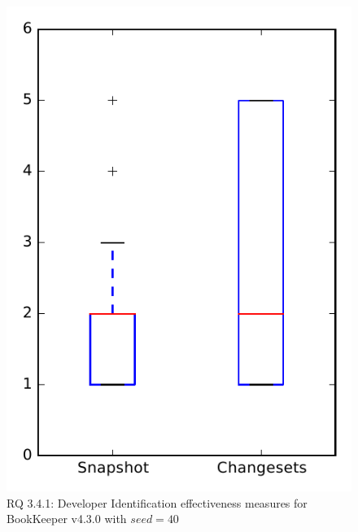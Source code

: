 
\begin{figure}
\centering
\includegraphics[height=0.4\textheight]{figures/dit_seed/rq1_bookkeeper_40}
\caption{RQ 3.4.1: Developer Identification effectiveness measures for BookKeeper v4.3.0 with $seed=40$}
\label{fig:dit_seed:rq1:bookkeeper}
\end{figure}
